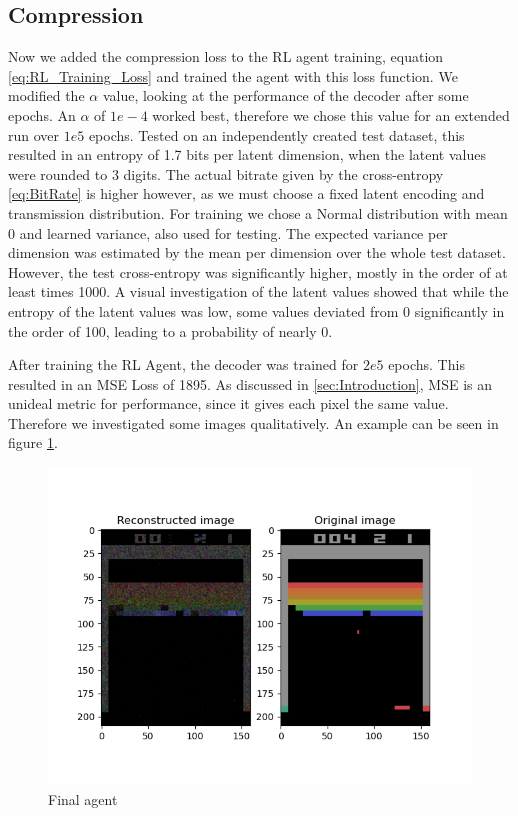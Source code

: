 \subsection{Compression}\label{sub:Results_Compression} Now we added the
compression loss to the RL agent training, equation \ref{eq:RL_Training_Loss}
and trained the agent with this loss function. We modified the $\alpha$ value,
looking at the performance of the decoder after some epochs. An $\alpha$ of
$1e-4$ worked best, therefore we chose this value for an extended run over $1e5$
epochs. Tested on an independently created test dataset, this resulted in an
entropy of 1.7 bits per latent dimension, when the latent values were rounded to
3 digits. The actual bitrate given by the cross-entropy \ref{eq:BitRate} is
higher however, as we must choose a fixed latent encoding and transmission
distribution. For training we chose a Normal distribution with mean 0 and
learned variance, also used for testing. The expected variance per dimension was
estimated by the mean per dimension over the whole test dataset. However, the
test cross-entropy was significantly higher, mostly in the order of at least
times 1000. A visual investigation of the latent values showed that while the
entropy of the latent values was low, some values deviated from 0 significantly
in the order of 100, leading to a probability of nearly 0.

After training the RL Agent, the decoder was trained for $2e5$ epochs. This
resulted in an MSE Loss of 1895. As discussed in \ref{sec:Introduction}, MSE
is an unideal metric for performance, since it gives each pixel the same
value. Therefore we investigated some images qualitatively. An example can be seen in figure
\ref{fig:final_agent}.
\begin{figure}[H]
    \centering
    \includegraphics[width=\linewidth]{images/orig_reconstructed_final_agent.png}
    \caption{Final agent}
    \label{fig:final_agent}
\end{figure}

